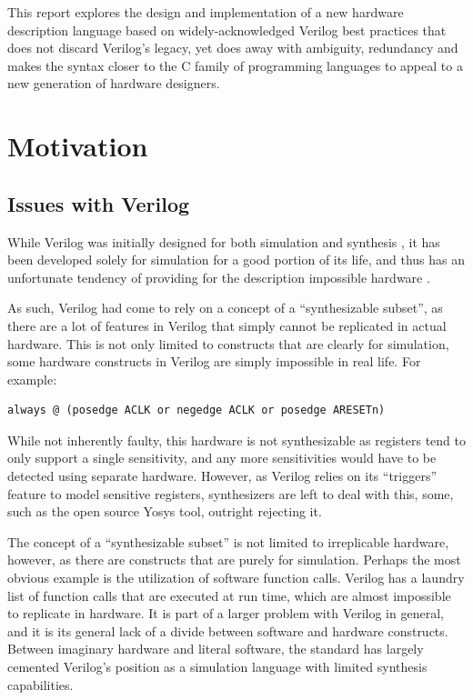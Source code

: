 \documentclass[10pt, two column]{article}
\theoremstyle{definition}
\begin{document}
This report explores the design and implementation of a new hardware description language based on widely-acknowledged Verilog best practices that does not discard Verilog’s legacy, yet does away with ambiguity, redundancy and makes the syntax closer to the C family of programming languages to appeal to a new generation of hardware designers.

\section{Motivation}
\subsection{Issues with Verilog}
While Verilog was initially designed for both simulation and synthesis \cite{threeDecadesofHDL}, 
it has been developed solely for simulation for a good portion of its life, and thus has an unfortunate tendency of providing for the description impossible hardware \cite{borrione1992three}.\newline

As such, Verilog had come to rely on a concept of a “synthesizable subset”\cite{synthesizableSubset_2017}, as there are a lot of features in Verilog that simply cannot be replicated in actual hardware. This is not only limited to constructs that are clearly for simulation, some hardware constructs in Verilog are simply impossible in real life. For example: 
\begin{lstlisting}
always @ (posedge ACLK or negedge ACLK or posedge ARESETn)
\end{lstlisting}

While not inherently faulty, this hardware is not synthesizable as registers tend to only support a single sensitivity, and any more sensitivities would have to be detected using separate hardware. However, as Verilog relies on its “triggers” feature to model sensitive registers, synthesizers are left to deal with this, some, such as the open source Yosys tool, outright rejecting it.\newline

The concept of a “synthesizable subset” is not limited to irreplicable hardware, however, as there are constructs that are purely for simulation. Perhaps the most obvious example is the utilization of software function calls. Verilog has a laundry list of function calls that are executed at run time, which are almost impossible to replicate in hardware. It is part of a larger problem with Verilog in general, and it is its general lack of a divide between software and hardware constructs. Between imaginary hardware and literal software, the standard has largely cemented Verilog’s position as a simulation language with limited synthesis capabilities.
\end{document}
